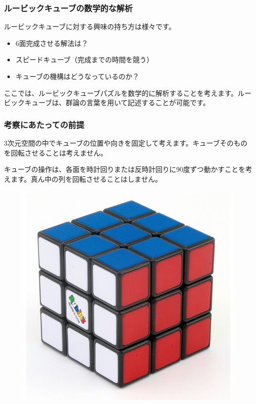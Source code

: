 \documentclass{beamer}
\begin{document}
\begin{frame}
    \frametitle{ルービックキューブの数学的な解析}

    ルービックキューブに対する興味の持ち方は様々です。

    \begin{itemize}
        \item 6面完成させる解法は？
        \item スピードキューブ（完成までの時間を競う）
        \item キューブの機構はどうなっているのか？
    \end{itemize}

    \bigskip

    ここでは、ルービックキューブパズルを数学的に解析することを考えます。ルービックキューブは、群論の言葉を用いて記述することが可能です。
\end{frame}

\begin{frame}
    \frametitle{考察にあたっての前提}

    3次元空間の中でキューブの位置や向きを固定して考えます。キューブそのものを回転させることは考えません。

    キューブの操作は、各面を時計回りまたは反時計回りに90度ずつ動かすことを考えます。真ん中の列を回転させることはしません。

    \begin{figure}
        \includegraphics[scale=0.2]{images/rubik3.jpg}
    \end{figure}
\end{frame}
\end{document}
